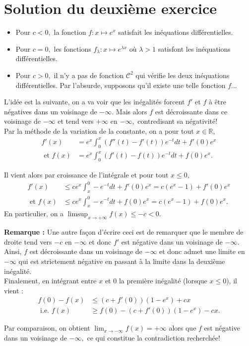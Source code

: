 \section{Solution du deuxième exercice}

\begin{itemize}
\item Pour $c<0,$ la fonction $\displaystyle f: x\mapsto e^{x}$ satisfait les inéquations différentielles.
\item Pour $c=0,$ les fonctions $\displaystyle f_{\lambda} :x \mapsto e^{\lambda x}$ où $\lambda>1$ satisfont les inéquations différentielles.
\item Pour $c>0,$ il n'y a pas de fonction $\mathcal{C}^{2}$ qui vérifie les deux inéquations différentielles.
Par l'absurde, supposons qu'il existe une telle fonction $f$...
\end{itemize}

L'idée est la suivante, on a va voir que les inégalités forcent $f'$ et $f$ à être négatives dans un voisinage de $-\infty.$
Mais alors $f$ est décroissante dans ce voisinage de $-\infty$ et tend vers $+\infty$ en $-\infty,$ contredisant sa négativité!
\\

Par la méthode de la variation de la constante, on a pour tout $x\in\mathbb{R},$
\begin{align*}
f'(x) & =e^{x}\int_{0}^{x}\left(f''(t)-f'(t)\right)e^{-t}dt+f'(0)e^{x}\\
\mbox{ et } f(x) & =e^{x}\int_{0}^{x}\left(f'(t)-f(t)\right)e^{-t}dt+f(0)e^{x}.
\end{align*}

Il vient alors par croissance de l'intégrale et pour tout $x\leq 0,$ \begin{align*}
f'(x) & \leq ce^{x}\int_{x}^{0}-e^{-t}dt+f'(0)e^{x} = c(e^{x}-1)+f'(0)e^{x}\\
\mbox{ et } f(x)& \leq ce^{x}\int_{x}^{0}-e^{-t}dt+f(0)e^{x} = c(e^{x}-1)+f(0)e^{x}.
\end{align*}
En particulier, on a $\displaystyle \limsup_{x\rightarrow +\infty} f(x) \leq -c<0.$ 

\textbf{Remarque : } Une autre façon d'écrire ceci est de remarquer que le membre de droite tend vers $-c$ en $-\infty$ et donc $f'$ est négative dans un voisinage de $-\infty.$ Ainsi, $f$ est décroissante dans un voisinage de $-\infty$ et donc admet une limite en $-\infty$ qui est strictement négative en passant à la limite dans la deuxième inégalité.
\\

Finalement, en intégrant entre $x$ et $0$ la première inégalité (lorsque $x\leq 0$), il vient : 
\begin{align*}
f(0)-f(x) & \leq (c+f'(0))(1-e^{x})+cx\\
\mbox{ i.e. } f(x) & \geq f(0)-(c+f'(0))(1-e^{x})-cx.
\end{align*}

Par comparaison, on obtient $\displaystyle \lim_{x\rightarrow -\infty} f(x)=+\infty$ alors que $f$ est négative dans un voisinage de $-\infty,$ ce qui constitue la contradiction recherchée!
